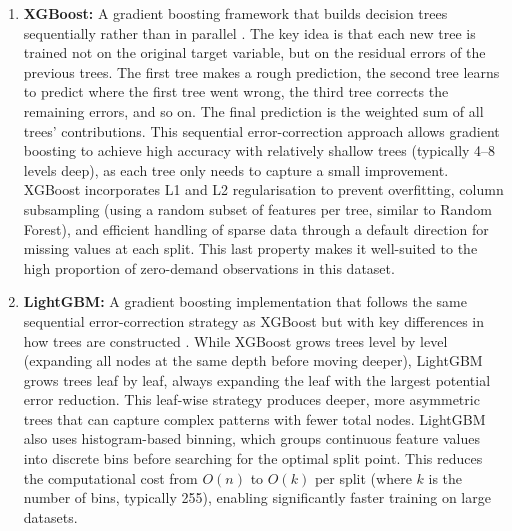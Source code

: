 \begin{enumerate}
    \item \textbf{XGBoost:} A gradient boosting framework that builds decision trees sequentially rather than in parallel \citep{chen2016xgboost}. The key idea is that each new tree is trained not on the original target variable, but on the residual errors of the previous trees. The first tree makes a rough prediction, the second tree learns to predict where the first tree went wrong, the third tree corrects the remaining errors, and so on. The final prediction is the weighted sum of all trees' contributions. This sequential error-correction approach allows gradient boosting to achieve high accuracy with relatively shallow trees (typically 4--8 levels deep), as each tree only needs to capture a small improvement. XGBoost incorporates L1 and L2 regularisation to prevent overfitting, column subsampling (using a random subset of features per tree, similar to Random Forest), and efficient handling of sparse data through a default direction for missing values at each split. This last property makes it well-suited to the high proportion of zero-demand observations in this dataset.

    \item \textbf{LightGBM:} A gradient boosting implementation that follows the same sequential error-correction strategy as XGBoost but with key differences in how trees are constructed \citep{ke2017lightgbm}. While XGBoost grows trees level by level (expanding all nodes at the same depth before moving deeper), LightGBM grows trees leaf by leaf, always expanding the leaf with the largest potential error reduction. This leaf-wise strategy produces deeper, more asymmetric trees that can capture complex patterns with fewer total nodes. LightGBM also uses histogram-based binning, which groups continuous feature values into discrete bins before searching for the optimal split point. This reduces the computational cost from $O(n)$ to $O(k)$ per split (where $k$ is the number of bins, typically 255), enabling significantly faster training on large datasets.


\end{enumerate}
